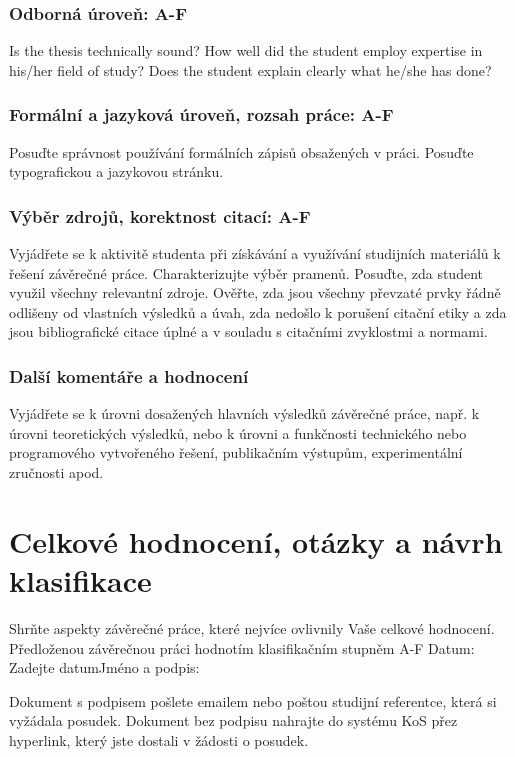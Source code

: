 \documentclass{article}
\begin{document}
\subsubsection*{Odborná úroveň: A-F} %
Is the thesis technically sound? How well did the student employ expertise in his/her field of study? Does the student explain clearly what he/she has done?

\subsubsection*{Formální a jazyková úroveň, rozsah práce: A-F} %
Posuďte správnost používání formálních zápisů obsažených v práci. Posuďte typografickou a jazykovou stránku.

\subsubsection*{Výběr zdrojů, korektnost citací: A-F} %
Vyjádřete se k aktivitě studenta při získávání a využívání studijních materiálů k řešení závěrečné práce. Charakterizujte výběr pramenů. Posuďte, zda student využil všechny relevantní zdroje. Ověřte, zda jsou všechny převzaté prvky řádně odlišeny od vlastních výsledků a úvah, zda nedošlo k porušení citační etiky a zda jsou bibliografické citace úplné a v souladu s citačními zvyklostmi a normami.

\subsubsection*{Další komentáře a hodnocení} %
Vyjádřete se k úrovni dosažených hlavních výsledků závěrečné práce, např. k úrovni teoretických výsledků, nebo k úrovni a funkčnosti technického nebo programového vytvořeného řešení, publikačním výstupům, experimentální zručnosti apod.

\section{Celkové hodnocení, otázky a návrh klasifikace}
Shrňte aspekty závěrečné práce, které nejvíce ovlivnily Vaše celkové hodnocení.
\\\vspace{5mm}
Předloženou závěrečnou práci hodnotím klasifikačním stupněm  A-F
\vspace{5mm}
Datum: Zadejte datum\hfill                        Jméno a podpis:\hspace{2cm}
\vspace{5mm}
\vfill

Dokument s podpisem pošlete emailem nebo poštou studijní referentce, která si vyžádala posudek.
Dokument bez podpisu nahrajte do systému KoS přez hyperlink, který jste dostali v žádosti o posudek.
\end{document}
